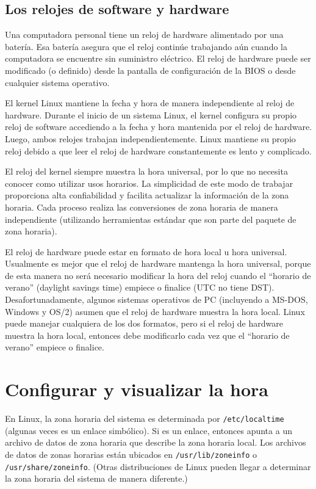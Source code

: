 \documentclass[12pt]{article}
\begin{document}
\subsection{ Los relojes de software y hardware}


Una computadora personal tiene un reloj de hardware alimentado por una batería.
Esa batería asegura que el reloj continúe trabajando aún cuando la computadora se encuentre sin
suministro eléctrico. El reloj de hardware puede ser modificado (o definido)
desde la pantalla de configuración de la BIOS o desde cualquier sistema operativo.


El kernel Linux mantiene la fecha y hora de manera independiente al reloj de hardware.
Durante el inicio de un sistema Linux, el kernel configura su propio reloj de software accediendo
a la fecha y hora mantenida por el reloj de hardware.
Luego, ambos relojes trabajan independientemente.
Linux mantiene su propio reloj debido a que leer el reloj de hardware constantemente es lento y complicado.



El reloj del kernel siempre muestra la hora universal, por lo que
no necesita conocer como utilizar usos horarios. La simplicidad de este
modo de trabajar proporciona alta confiabilidad y facilita actualizar 
la información de la zona horaria. Cada proceso realiza las conversiones de zona horaria 
de manera independiente (utilizando herramientas estándar que son parte del paquete de zona horaria).



El reloj de hardware puede estar en formato de hora local u hora universal.
Usualmente es mejor que el reloj de hardware mantenga la hora universal,
porque de esta manera no será necesario modificar la hora del reloj cuando el ``horario de verano''
(daylight savings time) empiece o finalice (UTC no tiene DST). Desafortunadamente, algunos sistemas operativos de PC
(incluyendo a MS-DOS, Windows y OS/2) asumen que el reloj de hardware muestra la hora local.
Linux puede manejar cualquiera de los dos formatos, pero si el reloj de hardware muestra la hora local,
entonces debe modificarlo cada vez que el ``horario de verano'' empiece o finalice.


\section{
Configurar y visualizar la hora}


En Linux, la zona horaria del sistema es determinada por \texttt{/etc/localtime} (algunas veces
es un enlace simbólico). Si es un enlace, entonces apunta a un archivo de datos de zona horaria
que describe la zona horaria local. Los archivos de datos de zonas horarias están ubicados en
\texttt{/usr/lib/zoneinfo} o \texttt{/usr/share/zoneinfo}. (Otras distribuciones de Linux pueden llegar
a determinar la zona horaria del sistema de manera diferente.)
\end{document}

